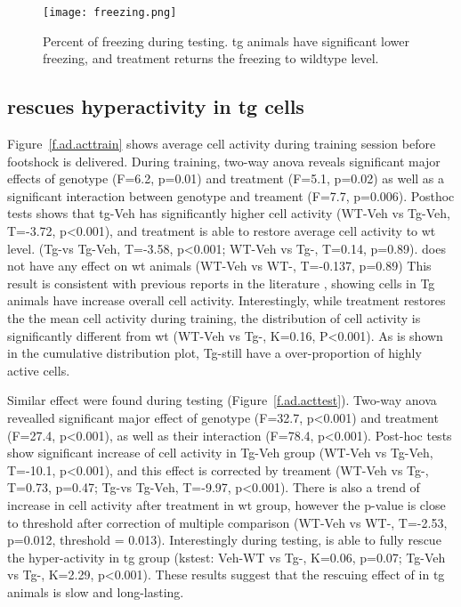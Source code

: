 \begin{figure}[h]
    \texttt{[image: freezing.png]}
    \caption{Percent of freezing during testing. \Gls{tg} animals have significant lower freezing, and \tglu treatment returns the freezing to wildtype level. \label{f.ad.freezing}}
\end{figure}



\subsection{\tglu rescues hyperactivity in \gls{tg} cells}

Figure~\ref{f.ad.acttrain} shows average cell activity during training session before footshock is delivered. During training, two-way \gls{anova} reveals significant major effects of genotype (F=6.2, p=0.01) and treatment (F=5.1, p=0.02) as well as a significant interaction between genotype and treament (F=7.7, p=0.006). Posthoc tests shows that \gls{tg}-Veh has significantly higher cell activity (WT-Veh vs Tg-Veh, T=-3.72, p<0.001), and \tglu treatment is able to restore average cell activity to \gls{wt} level. (Tg-\tglu vs Tg-Veh, T=-3.58, p<0.001; WT-Veh vs Tg-\tglu, T=0.14, p=0.89). \tglu does not have any effect on \gls{wt} animals (WT-Veh vs WT-\tglu, T=-0.137, p=0.89) This result is consistent with previous reports in the literature \citep{verret12}, showing cells in Tg animals have increase overall cell activity. Interestingly, while \tglu treatment restores the the mean cell activity during training, the distribution of cell activity is significantly different from \gls{wt} (WT-Veh vs Tg-\tglu, K=0.16, P<0.001). As is shown in the cumulative distribution plot, Tg-\tglu still have a over-proportion of highly active cells. 

Similar effect were found during testing (Figure~\ref{f.ad.acttest}). Two-way \gls{anova} revealled significant major effect of genotype (F=32.7, p<0.001) and treatment (F=27.4, p<0.001), as well as their interaction (F=78.4, p<0.001). Post-hoc tests show significant increase of cell activity in Tg-Veh group (WT-Veh vs Tg-Veh, T=-10.1, p<0.001), and this effect is corrected by \tglu treament (WT-Veh vs Tg-\tglu, T=0.73, p=0.47; Tg-\tglu vs Tg-Veh, T=-9.97, p<0.001). There is also a trend of increase in cell activity after \tglu treatment in \gls{wt} group, however the p-value is close to threshold after correction of multiple comparison (WT-Veh vs WT-\tglu, T=-2.53, p=0.012, threshold = 0.013). Interestingly during testing, \tglu is able to fully rescue the hyper-activity in \gls{tg} group (\gls{kstest}: Veh-WT vs Tg-\tglu, K=0.06, p=0.07; Tg-Veh vs Tg-\tglu, K=2.29, p<0.001). These results suggest that the rescuing effect of \tglu in \gls{tg} animals is slow and long-lasting.

